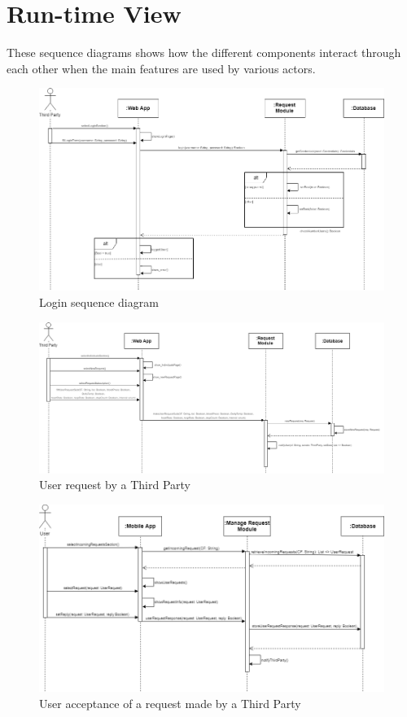 \section{Run-time View}
These sequence diagrams shows how the different components interact through each other when the main features are used by various actors.

\begin{figure}[H]
    \centering
    \includegraphics[scale=0.35]{DD/Pictures/login.png}
    \caption{Login sequence diagram}
\end{figure}

\begin{figure}[H]
    \centering
    \includegraphics[scale=0.35]{DD/Pictures/userRequest.png}
    \caption{User request by a Third Party}
\end{figure}

\begin{figure}[H]
    \centering
    \includegraphics[scale=0.35]{DD/Pictures/acceptRequest.png}
    \caption{User acceptance of a request made by a Third Party}
\end{figure}

